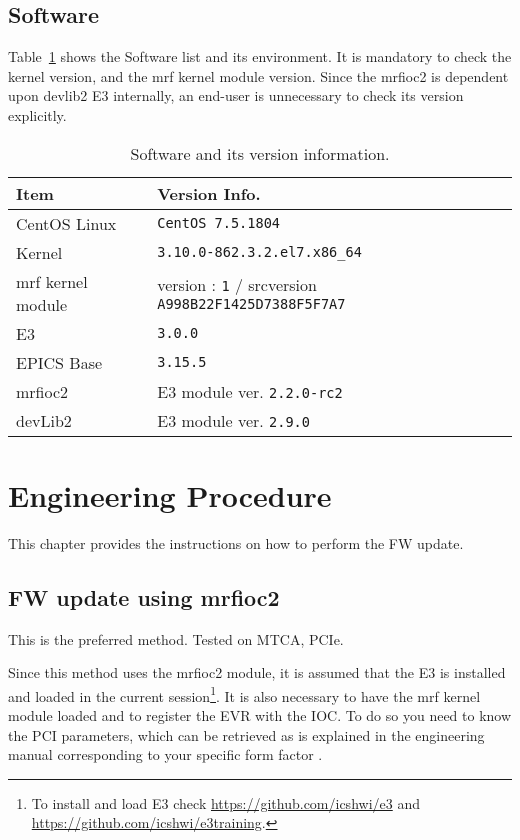 \documentclass[11pt
  , a4paper
  , article
  , oneside
  , showtrims
]{memoir}
\begin{document}
\section{Software}
Table~\ref{table:swlist} shows the Software list and its environment. It is mandatory to check the kernel version, and the mrf kernel module version. Since the mrfioc2 is dependent upon devlib2 E3 internally, an end-user is unnecessary to check its version explicitly.
\begin{table}[!htb]
  \centering
  \begin{tabular}{l|l}
    \toprule
    Item               & Version Info.                                                      \\\midrule
    CentOS Linux       & \texttt{CentOS 7.5.1804}                                           \\\midrule
    Kernel             & \texttt{3.10.0-862.3.2.el7.x86\_64}                                 \\\midrule
    mrf kernel module  & version : \texttt{1} / srcversion \texttt{A998B22F1425D7388F5F7A7} \\\midrule
    E3                 & \texttt{3.0.0}                                                     \\\midrule
    EPICS Base         & \texttt{3.15.5}                                                    \\\midrule
    mrfioc2            & E3 module ver. \texttt{2.2.0-rc2}                                  \\\midrule
    devLib2            & E3 module ver. \texttt{2.9.0}                                      \\\bottomrule
  \end{tabular}
  \caption[]{Software and its version information.}
  \label{table:swlist}
\end{table}


\clearpage
\chapter{Engineering Procedure}
This chapter provides the instructions on how to perform the FW update.


\section{FW update using mrfioc2}
This is the preferred method. Tested on MTCA, PCIe.

Since this method uses the mrfioc2 module, it is assumed that the E3 is installed and loaded in the current session{\footnote{To install and load E3 check \url{https://github.com/icshwi/e3} and \url{https://github.com/icshwi/e3training}.}}. It is also necessary to have the mrf kernel module loaded and to register the EVR with the IOC. To do so you need to know the PCI parameters, which can be retrieved as is explained in the engineering manual corresponding to your specific form factor \cite{empcieeevr300dc, emmtcaevr300}.
\end{document}
